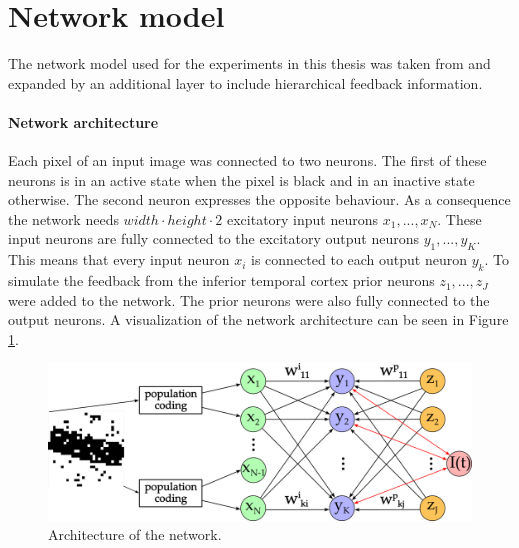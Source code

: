 \section{Network model}

The network model used for the experiments in this thesis was taken from \citet{nessler} and expanded by an additional layer to include hierarchical feedback information.

\paragraph{Network architecture}
Each pixel of an input image was connected to two neurons. The first of these neurons is in an active state when the pixel is black and in an inactive state otherwise. The second neuron expresses the opposite behaviour. As a consequence the network needs $width \cdot height \cdot 2$ excitatory input neurons $x_1,...,x_N$. These input neurons are fully connected to the excitatory output neurons $y_1,...,y_K$. This means that every input neuron $x_i$ is connected to each output neuron $y_k$. 
To simulate the feedback from the inferior temporal cortex prior neurons $z_1,...,z_J$ were added to the network. The prior neurons were also fully connected to the output neurons. A visualization of the network architecture can be seen in Figure \ref{fig:networkArchitecture}.

\begin{figure}
  \label{fig:networkArchitecture}
  \includegraphics[width=\linewidth]{figures/networkPlan.png}
  \caption{Architecture of the network.}
\end{figure}

